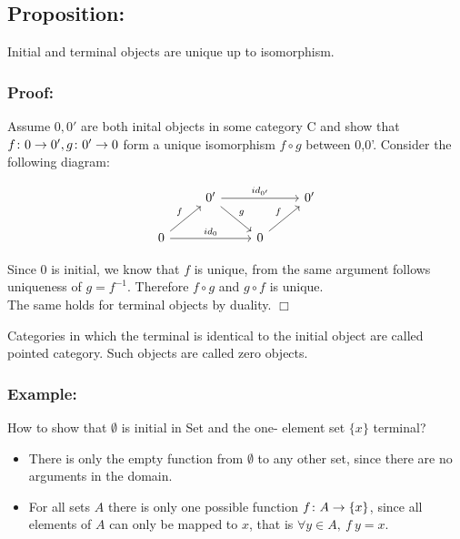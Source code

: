 \subsection {Proposition:}
Initial and terminal objects are unique up to isomorphism.

\subsubsection {Proof:}
Assume $0, 0'$ are both inital objects in some category C and show that
$f \from 0 \to 0', g \from 0' \to 0$ form a unique isomorphism
$f \circ g$ between 0,0'. Consider the following diagram:

\[
\begin{tikzcd}
  & 0' \arrow{dr}{g} \arrow{rr}{id_{0'}}    &&  0'\\
  0 \arrow{ur}{f} \arrow{rr}{id_0} && 0 \arrow{ur}{f}
\end{tikzcd}
\]

Since $0$ is initial, we know that $f$ is unique, from the same argument follows uniqueness of $g = f^{-1}$.
Therefore $f \circ g$ and $g \circ f$ is unique.\\
The same holds for terminal objects by duality. $\Box$

Categories in which the terminal is identical to the initial object are called pointed category.
Such objects are called zero objects.

\subsubsection {Example:}
How to show that $\emptyset$ is initial in Set and the one- element set $\{x\}$ terminal?

\begin {itemize}
\item There is only the empty function from $\emptyset$ to any other set, since there are no arguments in the domain.
\item For all sets $A$ there is only one possible function $f \from A \to \{x\}$, since all elements of $A$ can only be mapped
  to $x$, that is $\forall y \in A,\ f \ y = x$.
\end{itemize}


